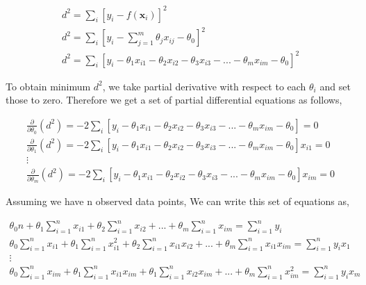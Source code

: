 \documentclass[english]{tktltiki}
\begin{document}
\begin{eqnarray}
d^2 = \sum_i[y_i - f(\mathbf{x}_i)]^2 \nonumber\\
d^2 = \sum_i[y_i - \sum_{j=1}^m \theta_j x_{ij} - \theta_0]^2 \nonumber\\
d^2 = \sum_i[y_i - \theta_1x_{i1} - \theta_2x_{i2} - \theta_3x_{i3} - ... - \theta_mx_{im} - \theta_0]^2
\end{eqnarray}

To obtain minimum $d^2$, we take partial derivative with respect to each $\theta_i$ and set those to zero. Therefore we get a set of partial differential equations as follows,

\begin{eqnarray}
\frac{\partial}{\partial{\theta_0}}(d^2) = -2\sum_i[y_i - \theta_1x_{i1} - \theta_2x_{i2} - \theta_3x_{i3} - ... - \theta_mx_{im} - \theta_0] = 0\nonumber \\
\frac{\partial}{\partial{\theta_1}}(d^2) = -2\sum_i[y_i - \theta_1x_{i1} - \theta_2x_{i2} - \theta_3x_{i3} - ... - \theta_mx_{im} - \theta_0]x_{i1} = 0\nonumber \\
\vdots \nonumber \\
\frac{\partial}{\partial{\theta_m}}(d^2) = -2\sum_i[y_i - \theta_1x_{i1} - \theta_2x_{i2} - \theta_3x_{i3} - ... - \theta_mx_{im} - \theta_0]x_{im} = 0
\end{eqnarray}

Assuming we have n observed data points, We can write this set of equations as,

\begin{eqnarray}
\theta_0 n + \theta_1 \sum_{i=1}^n x_{i1} + \theta_2 \sum_{i=1}^n x_{i2} + ... + \theta_m \sum_{i=1}^n x_{im} = \sum_{i=1}^n y_i \nonumber \\
\theta_0 \sum_{i=1}^n x_{i1} + \theta_1 \sum_{i=1}^n x_{i1}^2 + \theta_2 \sum_{i=1}^n x_{i1} x_{i2} +  ... + \theta_m \sum_{i=1}^n x_{i1} x_{im} = \sum_{i=1}^n y_i x_1 \nonumber \\
\vdots \nonumber \\
\theta_0 \sum_{i=1}^n x_{im} + \theta_1 \sum_{i=1}^n x_{i1} x_{im} + \theta_1 \sum_{i=1}^n x_{i2} x_{im} + ... + \theta_m \sum_{i=1}^n x_{im}^2 = \sum_{i=1}^n y_i x_m
\end{eqnarray}
\end{document}
